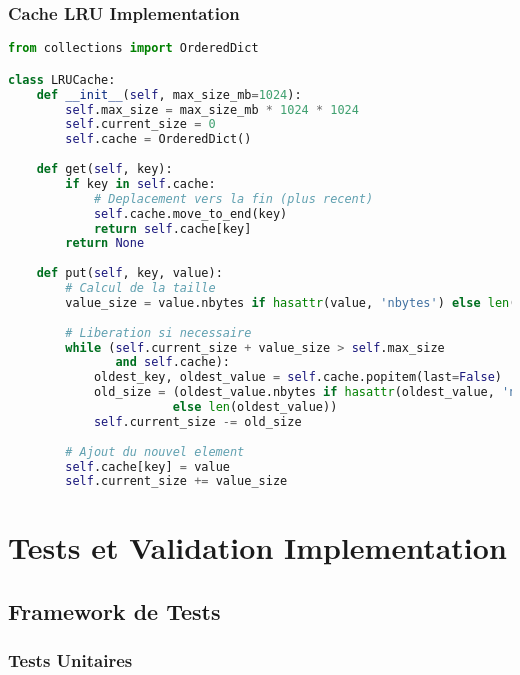 \documentclass[12pt,a4paper]{article}
\begin{document}
\subsubsection{Cache LRU Implementation}

\begin{lstlisting}[language=Python]
from collections import OrderedDict

class LRUCache:
    def __init__(self, max_size_mb=1024):
        self.max_size = max_size_mb * 1024 * 1024
        self.current_size = 0
        self.cache = OrderedDict()
        
    def get(self, key):
        if key in self.cache:
            # Deplacement vers la fin (plus recent)
            self.cache.move_to_end(key)
            return self.cache[key]
        return None
    
    def put(self, key, value):
        # Calcul de la taille
        value_size = value.nbytes if hasattr(value, 'nbytes') else len(value)
        
        # Liberation si necessaire
        while (self.current_size + value_size > self.max_size 
               and self.cache):
            oldest_key, oldest_value = self.cache.popitem(last=False)
            old_size = (oldest_value.nbytes if hasattr(oldest_value, 'nbytes') 
                       else len(oldest_value))
            self.current_size -= old_size
        
        # Ajout du nouvel element
        self.cache[key] = value
        self.current_size += value_size
\end{lstlisting}

\section{Tests et Validation Implementation}

\subsection{Framework de Tests}

\subsubsection{Tests Unitaires}
\end{document}
